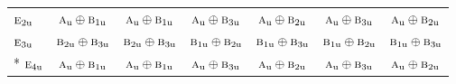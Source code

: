 \documentclass[10pt,a4paper]{article}
\numberwithin{equation}{section}
\newcommand{\irr}[1]{\text{\normalfont\scshape #1}}
\newcommand{\ptag}[1]{\mathrm{#1}}
\begin{document}
{\begin{longtable}{@{}lcccccc@{}}
$\irr{e}_{2\ptag{u}}$ & $\irr{a}_{\ptag{u}}\oplus \irr{b}_{1\ptag{u}}$ & $\irr{a}_{\ptag{u}}\oplus \irr{b}_{1\ptag{u}}$ & $\irr{a}_{\ptag{u}}\oplus \irr{b}_{3\ptag{u}}$ & $\irr{a}_{\ptag{u}}\oplus \irr{b}_{2\ptag{u}}$ & $\irr{a}_{\ptag{u}}\oplus \irr{b}_{3\ptag{u}}$ & $\irr{a}_{\ptag{u}}\oplus \irr{b}_{2\ptag{u}}$\\
$\irr{e}_{3\ptag{u}}$ & $\irr{b}_{2\ptag{u}}\oplus \irr{b}_{3\ptag{u}}$ & $\irr{b}_{2\ptag{u}}\oplus \irr{b}_{3\ptag{u}}$ & $\irr{b}_{1\ptag{u}}\oplus \irr{b}_{2\ptag{u}}$ & $\irr{b}_{1\ptag{u}}\oplus \irr{b}_{3\ptag{u}}$ & $\irr{b}_{1\ptag{u}}\oplus \irr{b}_{2\ptag{u}}$ & $\irr{b}_{1\ptag{u}}\oplus \irr{b}_{3\ptag{u}}$\\*
$\irr{e}_{4\ptag{u}}$ & $\irr{a}_{\ptag{u}}\oplus \irr{b}_{1\ptag{u}}$ & $\irr{a}_{\ptag{u}}\oplus \irr{b}_{1\ptag{u}}$ & $\irr{a}_{\ptag{u}}\oplus \irr{b}_{3\ptag{u}}$ & $\irr{a}_{\ptag{u}}\oplus \irr{b}_{2\ptag{u}}$ & $\irr{a}_{\ptag{u}}\oplus \irr{b}_{3\ptag{u}}$ & $\irr{a}_{\ptag{u}}\oplus \irr{b}_{2\ptag{u}}$\\
\bottomrule\end{longtable}}
\end{document}
